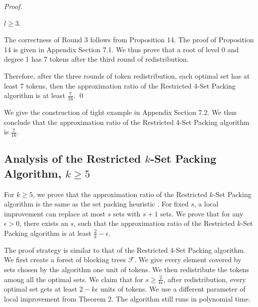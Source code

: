 \documentclass[runningheads,a4paper]{llncs}
\numberwithin{equation}{section}
\begin{document}
\begin{proof}
\begin{proposition}
$l\geq 3$.
\end{proposition}

The correctness of Round 3 follows from Proposition 14. The proof of Proposition 14 is given in Appendix Section 7.1. We thus prove that a root of level 0 and degree 1 has 7 tokens after the third round of redistribution.



Therefore, after the three rounds of token redistribution, each optimal set has at least 7 tokens, then the approximation ratio of the Restricted 4-Set Packing algorithm is at least $\frac{7}{16}$. \qed
\end{proof}

We give the construction of tight example in Appendix Section 7.2. We thus conclude that the approximation ratio of the Restricted 4-Set Packing algorithm is $\frac{7}{16}$.


\subsection{Analysis of the Restricted $k$-Set Packing Algorithm, $k\geq 5$}

For $k\geq 5$, we prove that the approximation ratio of the Restricted $k$-Set Packing algorithm is the same as the set packing heuristic \cite{schrijver}. For fixed $s$, a local improvement can replace at most $s$ sets with $s+1$ sets. We prove that for any $\epsilon>0$, there exists an $s$, such that the approximation ratio of the Restricted $k$-Set Packing algorithm is at least $\frac{2}{k}-\epsilon$.

The proof strategy is similar to that of the Restricted 4-Set Packing algorithm. We first create a forest of blocking trees $\mathscr{F}$. We give every element covered by sets chosen by the algorithm one unit of tokens. We then redistribute the tokens among all the optimal sets. We claim that for $s\geq\frac{2}{k\epsilon}$, after redistribution, every optimal set gets at least $2-k\epsilon$ units of tokens. We use a different parameter of local improvement from Theorem 2. The algorithm still runs in polynomial time.
\end{document}
